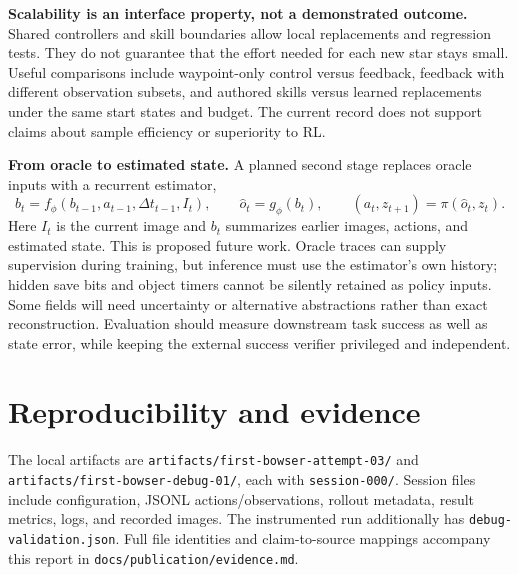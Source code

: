 \documentclass[10pt,letterpaper]{article}
\newcommand{\code}[1]{\texttt{#1}}
\begin{document}
\textbf{Scalability is an interface property, not a demonstrated outcome.} Shared controllers and skill boundaries allow local replacements and regression tests. They do not guarantee that the effort needed for each new star stays small. Useful comparisons include waypoint-only control versus feedback, feedback with different observation subsets, and authored skills versus learned replacements under the same start states and budget. The current record does not support claims about sample efficiency or superiority to RL.

\textbf{From oracle to estimated state.} A planned second stage replaces oracle inputs with a recurrent estimator,
\begin{equation}
 b_t=f_\phi(b_{t-1},a_{t-1},\Delta t_{t-1},I_t),\qquad
 \hat{o}_t=g_\phi(b_t),\qquad (a_t,z_{t+1})=\pi(\hat{o}_t,z_t).
\end{equation}
Here $I_t$ is the current image and $b_t$ summarizes earlier images, actions, and estimated state. This is proposed future work. Oracle traces can supply supervision during training, but inference must use the estimator's own history; hidden save bits and object timers cannot be silently retained as policy inputs. Some fields will need uncertainty or alternative abstractions rather than exact reconstruction. Evaluation should measure downstream task success as well as state error, while keeping the external success verifier privileged and independent.

\clearpage
\section{Reproducibility and evidence}
The local artifacts are \code{artifacts/first-bowser-attempt-03/} and \code{artifacts/first-bowser-debug-01/}, each with \code{session-000/}. Session files include configuration, JSONL actions/observations, rollout metadata, result metrics, logs, and recorded images. The instrumented run additionally has \code{debug-validation.json}. Full file identities and claim-to-source mappings accompany this report in \code{docs/publication/evidence.md}.
\end{document}
